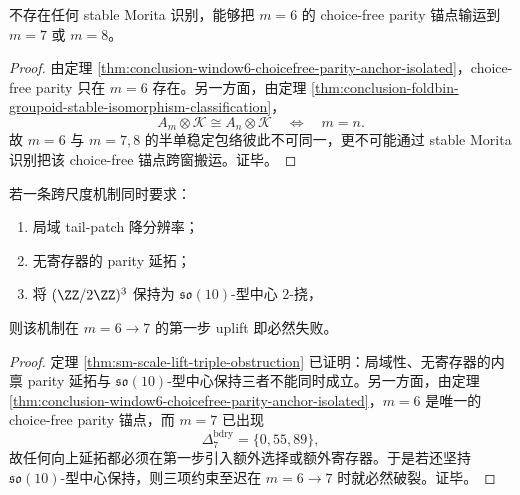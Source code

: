 \begin{corollary}\label{cor:conclusion-window6-choicefree-parity-not-stably-morita-transportable}
不存在任何 stable Morita 识别，能够把 \(m=6\) 的 choice-free parity 锚点输运到 \(m=7\) 或 \(m=8\)。
\end{corollary}
\begin{proof}
由定理 \ref{thm:conclusion-window6-choicefree-parity-anchor-isolated}，choice-free parity 只在 \(m=6\) 存在。另一方面，由定理 \ref{thm:conclusion-foldbin-groupoid-stable-isomorphism-classification}，
\[
A_m\otimes\mathcal K\cong A_n\otimes\mathcal K
\quad\Longleftrightarrow\quad
m=n.
\]
故 \(m=6\) 与 \(m=7,8\) 的半单稳定包络彼此不可同一，更不可能通过 stable Morita 识别把该 choice-free 锚点跨窗搬运。证毕。
\end{proof}

\begin{theorem}\label{thm:conclusion-window6-first-uplift-so10-trilemma}
若一条跨尺度机制同时要求：
\begin{enumerate}
  \item 局域 tail-patch 降分辨率；
  \item 无寄存器的 parity 延拓；
  \item 将 \((\ZZ/2\ZZ)^3\) 保持为 \(\mathfrak{so}(10)\)-型中心 \(2\)-挠，
\end{enumerate}
则该机制在 \(m=6\to 7\) 的第一步 uplift 即必然失败。
\end{theorem}
\begin{proof}
定理 \ref{thm:sm-scale-lift-triple-obstruction} 已证明：局域性、无寄存器的内禀 parity 延拓与 \(\mathfrak{so}(10)\)-型中心保持三者不能同时成立。另一方面，由定理 \ref{thm:conclusion-window6-choicefree-parity-anchor-isolated}，\(m=6\) 是唯一的 choice-free parity 锚点，而 \(m=7\) 已出现
\[
\Delta_7^{\mathrm{bdry}}=\{0,55,89\},
\]
故任何向上延拓都必须在第一步引入额外选择或额外寄存器。于是若还坚持 \(\mathfrak{so}(10)\)-型中心保持，则三项约束至迟在 \(m=6\to 7\) 时就必然破裂。证毕。
\end{proof}

